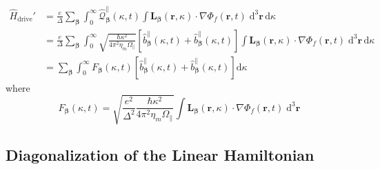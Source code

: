 \documentclass{article}
\begin{document}
\begin{equation}
\begin{split}
\hat{H}_\mathrm{drive}' &= \frac{e}{\Delta}\sum_{\bm{\beta}}\int_0^\infty\hat{\mathcal{Q}}_{\bm{\beta}}^\parallel(\kappa,t)\int\mathbf{L}_{\bm{\beta}}(\mathbf{r},\kappa)\cdot\nabla\Phi_f(\mathbf{r},t)\;\mathrm{d}^3\mathbf{r}\,\mathrm{d}\kappa\\
&= \frac{e}{\Delta}\sum_{\bm{\beta}}\int_0^\infty\sqrt{\frac{\hbar\kappa^2}{4\pi^2\eta_m\Omega_\parallel}}\left[\hat{b}_{\bm{\beta}}^\parallel(\kappa,t) + \hat{b}_{\bm{\beta}}^\parallel(\kappa,t)\right]\int\mathbf{L}_{\bm{\beta}}(\mathbf{r},\kappa)\cdot\nabla\Phi_f(\mathbf{r},t)\;\mathrm{d}^3\mathbf{r}\,\mathrm{d}\kappa\\
&= \sum_{\bm{\beta}}\int_0^\infty F_{\bm{\beta}}(\kappa,t)\left[\hat{b}_{\bm{\beta}}^\parallel(\kappa,t) + \hat{b}_{\bm{\beta}}^\parallel(\kappa,t)\right]\mathrm{d}\kappa
\end{split}
\end{equation}
where
\begin{equation}
F_{\bm{\beta}}(\kappa,t) = \sqrt{\frac{e^2}{\Delta^2}\frac{\hbar\kappa^2}{4\pi^2\eta_m\Omega_\parallel}}\int\mathbf{L}_{\bm{\beta}}(\mathbf{r},\kappa)\cdot\nabla\Phi_f(\mathbf{r},t)\;\mathrm{d}^3\mathbf{r}
\end{equation}












\subsection{Diagonalization of the Linear Hamiltonian}
\end{document}
